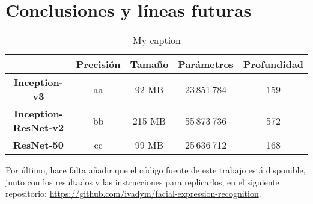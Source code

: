 \chapter{Conclusiones y líneas futuras} \label{Chapter:8}

\begin{table}
\centering
\label{my-label}
\begin{tabular}{c|c|c|c|c|}
\cline{2-5}
 & \textbf{Precisión} & \textbf{Tamaño} & \textbf{Parámetros} & \textbf{Profundidad} \\ \hline
\multicolumn{1}{|c|}{\textbf{Inception-v3}} & aa & 92 MB & 23\,851\,784 & 159 \\ \hline
\multicolumn{1}{|c|}{\textbf{Inception-ResNet-v2}} & bb & 215 MB & 55\,873\,736 & 572 \\ \hline
\multicolumn{1}{|c|}{\textbf{ResNet-50}} & cc & 99 MB & 25\,636\,712 & 168 \\ \hline
\end{tabular}
\caption{My caption} \label{Table:Models}
\end{table}


Por último, hace falta añadir que el código fuente de este trabajo está disponible, junto con los resultados y las instrucciones para replicarlos, en el siguiente repositorio: \url{https://github.com/ivadym/facial-expression-recognition}.